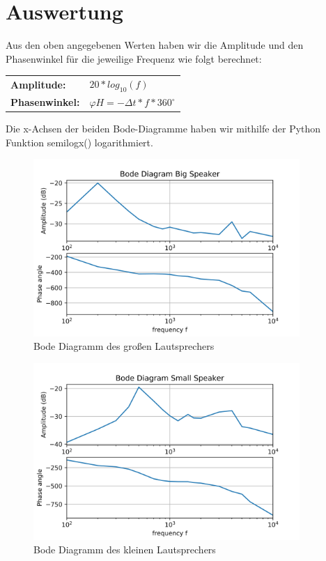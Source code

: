 \documentclass[12pt, oneside, a4paper, \docLanguage]{report}
\begin{document}
\section{Auswertung}
\label{chap:VERSUCH_2_AUSWERTUNG}
\begin{normalsize}
Aus den oben angegebenen Werten haben wir die Amplitude und den Phasenwinkel für die jeweilige Frequenz wie folgt berechnet:
\begin{center}
	\begin{tabular}{ l l }
	\textbf{Amplitude:} & $20 * log_{10}(f)$ \\ 
	\textbf{Phasenwinkel:} & $\varphi H = - \Delta t * f * 360^\circ$ \\  
	\end{tabular}
\end{center}
Die x-Achsen der beiden Bode-Diagramme haben wir mithilfe der Python Funktion\newline
semilogx() logarithmiert.
\begin{figure}[H]
\includegraphics[width=0.9\textwidth]{../BodeDiagramBigSpeaker.png}
\caption{Bode Diagramm des großen Lautsprechers}
\end{figure}
\begin{figure}[H]
\includegraphics[width=0.9\textwidth]{../BodeDiagramSmallSpeaker.png}
\caption{Bode Diagramm des kleinen Lautsprechers}
\end{figure}
\end{normalsize}
\end{document}
